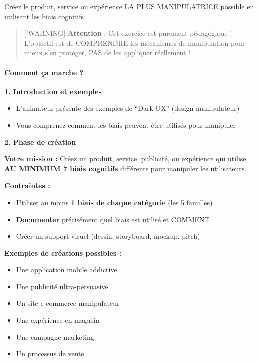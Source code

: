 \documentclass[
]{article}
\providecommand{\tightlist}{%
  \setlength{\itemsep}{0pt}\setlength{\parskip}{0pt}}
\begin{document}
Créer le produit, service ou expérience LA PLUS MANIPULATRICE possible
en utilisant les biais cognitifs

\begin{quote}
{[}!WARNING{]} \textbf{Attention} : Cet exercice est purement
pédagogique ! L'objectif est de COMPRENDRE les mécanismes de
manipulation pour mieux s'en protéger, PAS de les appliquer réellement !
\end{quote}

\paragraph{\texorpdfstring{\textbf{Comment ça marche
?}}{Comment ça marche ?}}\label{comment-uxe7a-marche-1}

\textbf{1. Introduction et exemples}

\begin{itemize}
\tightlist
\item
  L'animateur présente des exemples de ``Dark UX'' (design manipulateur)
\item
  Vous comprenez comment les biais peuvent être utilisés pour manipuler
\end{itemize}

\textbf{2. Phase de création}

\textbf{Votre mission :} Créez un produit, service, publicité, ou
expérience qui utilise \textbf{AU MINIMUM 7 biais cognitifs} différents
pour manipuler les utilisateurs.

\textbf{Contraintes :}

\begin{itemize}
\tightlist
\item
  Utiliser au moins \textbf{1 biais de chaque catégorie} (les 5
  familles)
\item
  \textbf{Documenter} précisément quel biais est utilisé et COMMENT
\item
  Créer un support visuel (dessin, storyboard, mockup, pitch)
\end{itemize}

\textbf{Exemples de créations possibles :}

\begin{itemize}
\tightlist
\item
  Une application mobile addictive
\item
  Une publicité ultra-persuasive
\item
  Un site e-commerce manipulateur
\item
  Une expérience en magasin
\item
  Une campagne marketing
\item
  Un processus de vente
\end{itemize}
\end{document}
